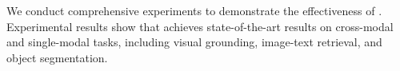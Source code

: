 We conduct comprehensive experiments to demonstrate the effectiveness of \onepeace. Experimental results show that \onepeace achieves state-of-the-art results on cross-modal and single-modal tasks, including visual grounding, image-text retrieval, and object segmentation.






